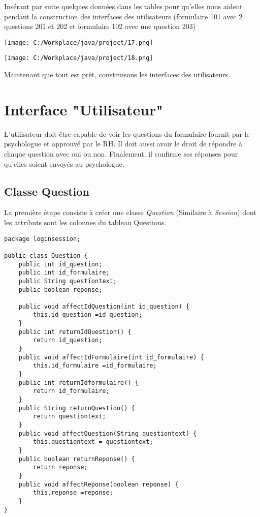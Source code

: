 \documentclass[12]{article}
\begin{document}
Insérant par suite quelques données dans les tables pour qu'elles nous aident pendant la construction des interfaces des utilisateurs (formulaire 101 avec 2 questions 201 et 202 et formulaire 102 avec une question 203)\\

 



\begin{center}
\hspace*{-2cm}\texttt{[image: C:/Workplace/java/project/17.png]}

\vspace{1cm}
\hspace*{-3cm}\texttt{[image: C:/Workplace/java/project/18.png]}
\end{center}


Maintenant que tout est prêt, construisons les interfaces des utilisateurs.\\

\section{Interface "Utilisateur"}
\indent


L'utilisateur doit être capable de voir les questions du formulaire fournit par le psychologue et approuvé par le RH. Il doit aussi avoir le droit de répondre à chaque question avec oui ou non. Finalement, il confirme ses réponses pour qu'elles soient envoyés au psychologue.\\
\subsection{Classe Question}

La première étape consiste à créer une classe \textit{Question} (Similaire à \textit{Session}) dont les attributs sont les colonnes du tableau Questions. \\





\lstset{language=java}
\begin{lstlisting}
package loginsession;

public class Question {
	public int id_question;
	public int id_formulaire;
	public String questiontext;
	public boolean reponse;
	
	public void affectIdQuestion(int id_question) {
		this.id_question =id_question;
	}
	public int returnIdQuestion() {
		return id_question;
	}
	public void affectIdFormulaire(int id_formulaire) {
		this.id_formulaire =id_formulaire;
	}
	public int returnIdformulaire() {
		return id_formulaire;
	}
	public String returnQuestion() {
		return questiontext;
	}
	public void affectQuestion(String questiontext) {
		this.questiontext = questiontext;
	}
	public boolean returnReponse() {
		return reponse;
	}
	public void affectReponse(boolean reponse) {
		this.reponse =reponse;
	}
}

\end{lstlisting}
\end{document}
